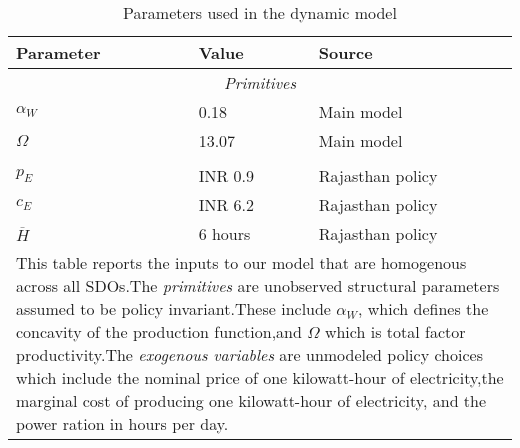 \begin{table}[!ht]
	\centering
	\caption{Parameters used in the dynamic model \label{tab:dynamicParameters}} 
	\begin{tabular}{p{2 cm}p{2 cm}p{6 cm}}
		\toprule
		 Parameter & Value & Source \\
		\midrule
		\multicolumn{3}{c}{\emph{Primitives}} \\
 		\addlinespace 
		 $\alpha_W$ & 0.18 & Main model \\
		 $\Omega$ & 13.07 & Main model \\
		\addlinespace
 		\multicolumn{3}{c}{\emph{Exogenous variables}} \\
 		\addlinespace 
		 $p_E$ & INR 0.9  & Rajasthan policy \\
		 $c_E$ & INR 6.2  & Rajasthan policy \\
		 $\overline{H}$ & 6 hours & Rajasthan policy \\
		\bottomrule
		\multicolumn{3}{p{0.65\hsize}}{\footnotesize This table reports the inputs to our model that are homogenous across all SDOs.The \emph{primitives} are unobserved structural parameters assumed to be policy invariant.These include $\alpha_W$, which defines the concavity of the production function,and $\Omega$ which is total factor productivity.The \emph{exogenous variables} are unmodeled policy choices which include the nominal price of one kilowatt-hour of electricity,the marginal cost of producing one kilowatt-hour of electricity, and the power ration in hours per day.}
	\end{tabular}
\end{table}